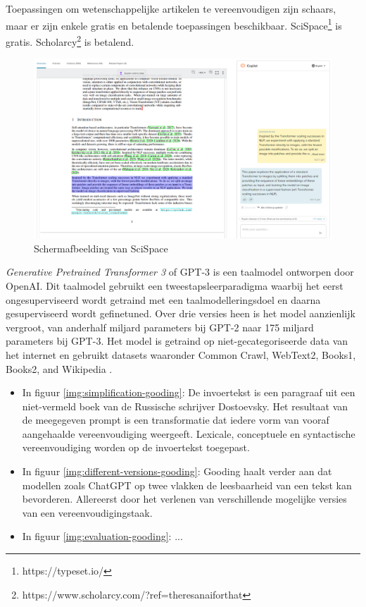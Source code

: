 \medspace

Toepassingen om wetenschappelijke artikelen te vereenvoudigen zijn schaars, maar er zijn enkele gratis en betalende toepassingen beschikbaar. SciSpace\footnote{https://typeset.io/} is gratis. Scholarcy\footnote{https://www.scholarcy.com/?ref=theresanaiforthat} is betalend. 

\begin{figure}
	\includegraphics{img/typeset-example.png}
	\caption{Schermafbeelding van SciSpace}
\end{figure}

\medspace

\textit{Generative Pretrained Transformer 3} of GPT-3 is een taalmodel ontworpen door OpenAI. Dit taalmodel gebruikt een tweestapsleerparadigma waarbij het eerst ongesuperviseerd wordt getraind met een taalmodelleringsdoel en daarna gesuperviseerd wordt gefinetuned. Over drie versies heen is het model aanzienlijk vergroot, van anderhalf miljard parameters bij GPT-2 naar 175 miljard parameters bij GPT-3. Het model is getraind op niet-gecategoriseerde data van het internet en gebruikt datasets waaronder Common Crawl, WebText2, Books1, Books2, and Wikipedia \autocite{Radford2019, Li2022}.

\begin{itemize}
	\item In figuur \ref{img:simplification-gooding}: De invoertekst is een paragraaf uit een niet-vermeld boek van de Russische schrijver Dostoevsky. Het resultaat van de meegegeven prompt is een transformatie dat iedere vorm van vooraf aangehaalde vereenvoudiging weergeeft. Lexicale, conceptuele en syntactische vereenvoudiging worden op de invoertekst toegepast.
	\item In figuur \ref{img:different-versions-gooding}: Gooding haalt verder aan dat modellen zoals ChatGPT op twee vlakken de leesbaarheid van een tekst kan bevorderen. Allereerst door het verlenen van verschillende mogelijke versies van een vereenvoudigingstaak.
	\item In figuur \ref{img:evaluation-gooding}: ...
\end{itemize}

